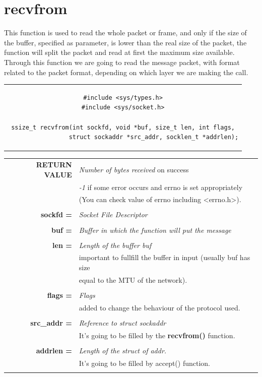 \section{recvfrom}
This function is used to read the whole packet or frame, and only if the size of the buffer, specified as parameter, is lower than the real size of the packet, the function will split the packet and read at first the maximum size available.\\Through this function we are going to read the message packet, with format related to the packet format, depending  on which layer we are making the call.
\begin{center}
\begin{tabular}{c}
\begin{lstlisting}[linewidth=340pt, basicstyle=\footnotesize\sffamily,]
#include <sys/types.h>
#include <sys/socket.h>

ssize_t recvfrom(int sockfd, void *buf, size_t len, int flags,
                 struct sockaddr *src_addr, socklen_t *addrlen);
\end{lstlisting}
\end{tabular}
\end{center}
\begin{table}[H]
\centering\footnotesize
\begin{tabular}{rl}
\textbf{RETURN VALUE} & {\textit{Number of bytes received} on success}\\
{} & {\textit{-1} if some error occurs and errno is set appropriately}\\
{} & {(You can check value of errno including <errno.h>).}\\
& \\
\textbf{sockfd =} & {\textit{Socket File Descriptor}}\\
&\\
\textbf{buf =} & {\textit{Buffer in which the function will put the message}}\\
&\\
\textbf{len =} & {\textit{Length of the buffer buf}}\\
&{important to fullfill the buffer in input (usually buf has size}\\
&{equal to the MTU of the network).}\\
&\\
\textbf{flags =} & {\textit{Flags}}\\
{} & {added to change the behaviour of the protocol used.}\\
& \\
\textbf{src\_addr =} & {\textit{Reference to struct sockaddr}}\\
{} & {It's going to be filled by the \textbf{recvfrom()} function.}\\
& \\
\textbf{addrlen =} & {\textit{Length of the struct of addr.}}\\
{} & {It's going to be filled by accept() function.}\\
&\\
\end{tabular}
\end{table}

